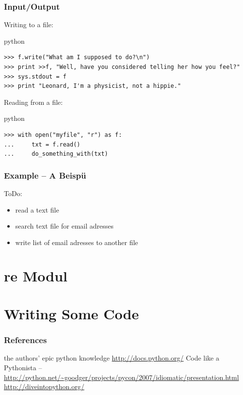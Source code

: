 \documentclass{beamer}
\begin{document}
\begin{frame}[fragile]
	\frametitle{Input/Output}
	Writing to a file:
	\begin{exampleblock}{python}
	\begin{lstlisting}
>>> f.write("What am I supposed to do?\n")
>>> print >>f, "Well, have you considered telling her how you feel?"
>>> sys.stdout = f
>>> print "Leonard, I'm a physicist, not a hippie."
	\end{lstlisting}
	\end{exampleblock}
\pause
	Reading from a file:
	\begin{exampleblock}{python}
	\begin{lstlisting}
>>> with open("myfile", "r") as f:
...     txt = f.read()
...     do_something_with(txt)
	\end{lstlisting}
	\end{exampleblock}
\end{frame}


\begin{frame}[fragile]
	\frametitle{Example -- A Beispü}
	
	ToDo:
	\begin{itemize}
	\item read a text file
	\item search text file for email adresses
	\item write list of email adresses to another file
	\end{itemize}
\end{frame}



\section{re Modul}

\section{Writing Some Code}





\begin{frame}
	\frametitle{References}
	\begin{thebibliography}{3}
	 the authors' epic python knowledge
	 \url{http://docs.python.org/}
	 Code like a Pythonista -- \url{http://python.net/~goodger/projects/pycon/2007/idiomatic/presentation.html}
	 \url{http://diveintopython.org/}
	\end{thebibliography}
\end{frame}
\end{document}
